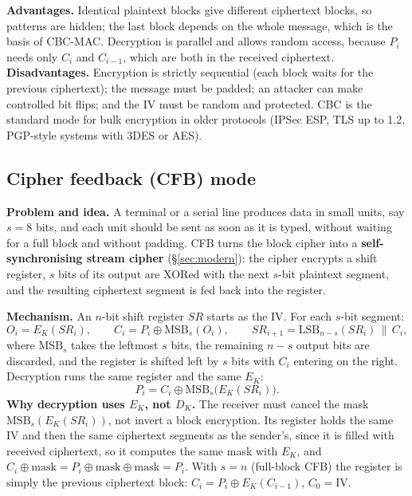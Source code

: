 \textbf{Advantages.} Identical plaintext blocks give different ciphertext blocks, so patterns are hidden; the last block depends on the whole message, which is the basis of CBC-MAC. Decryption is parallel and allows random access, because $P_i$ needs only $C_i$ and $C_{i-1}$, which are both in the received ciphertext. \textbf{Disadvantages.} Encryption is strictly sequential (each block waits for the previous ciphertext); the message must be padded; an attacker can make controlled bit flips; and the IV must be random and protected. CBC is the standard mode for bulk encryption in older protocols (IPSec ESP, TLS up to 1.2, PGP-style systems with 3DES or AES).

\subsection{Cipher feedback (CFB) mode \new}

\textbf{Problem and idea.} A terminal or a serial line produces data in small units, say $s = 8$ bits, and each unit should be sent as soon as it is typed, without waiting for a full block and without padding. CFB turns the block cipher into a \textbf{self-synchronising stream cipher} (\S\ref{sec:modern}): the cipher encrypts a shift register, $s$ bits of its output are XORed with the next $s$-bit plaintext segment, and the resulting ciphertext segment is fed back into the register.

\textbf{Mechanism.} An $n$-bit shift register $SR$ starts as the IV. For each $s$-bit segment:
\[
O_i = E_K(SR_i), \qquad C_i = P_i \oplus \mathrm{MSB}_s(O_i), \qquad SR_{i+1} = \mathrm{LSB}_{n-s}(SR_i) \,\|\, C_i ,
\]
where $\mathrm{MSB}_s$ takes the leftmost $s$ bits, the remaining $n - s$ output bits are discarded, and the register is shifted left by $s$ bits with $C_i$ entering on the right. Decryption runs the same register and the same $E_K$:
\[
P_i = C_i \oplus \mathrm{MSB}_s\big(E_K(SR_i)\big).
\]
\textbf{Why decryption uses $E_K$, not $D_K$.} The receiver must cancel the mask $\mathrm{MSB}_s(E_K(SR_i))$, not invert a block encryption. Its register holds the same IV and then the same ciphertext segments as the sender's, since it is filled with received ciphertext, so it computes the same mask with $E_K$, and $C_i \oplus \text{mask} = P_i \oplus \text{mask} \oplus \text{mask} = P_i$. With $s = n$ (full-block CFB) the register is simply the previous ciphertext block: $C_i = P_i \oplus E_K(C_{i-1})$, $C_0 = \mathrm{IV}$.

